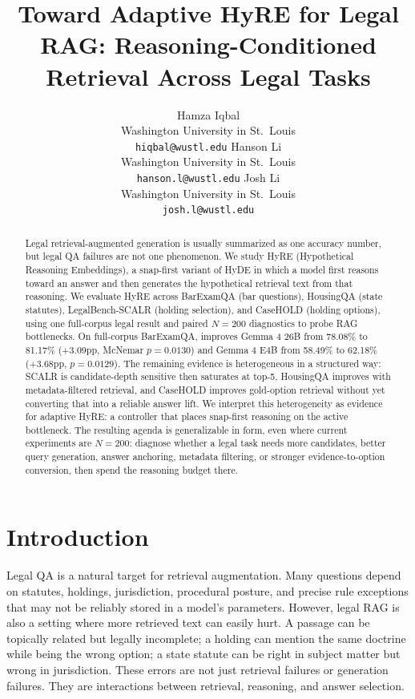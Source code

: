 \documentclass{article}
\title{Toward Adaptive HyRE for Legal RAG: Reasoning-Conditioned Retrieval Across Legal Tasks}
\author{%
  Hamza Iqbal \\
  Washington University in St.\ Louis \\
  \texttt{hiqbal@wustl.edu}
  \And
  Hanson Li \\
  Washington University in St.\ Louis \\
  \texttt{hanson.l@wustl.edu}
  \And
  Josh Li \\
  Washington University in St.\ Louis \\
  \texttt{josh.l@wustl.edu}
}
\newcommand{\method}[1]{\texttt{\detokenize{#1}}}
\newcommand{\hyre}{HyRE}
\begin{document}
\maketitle

\begin{abstract}
Legal retrieval-augmented generation is usually summarized as one accuracy
number, but legal QA failures are not one phenomenon. We study \hyre{}
(Hypothetical Reasoning Embeddings), a snap-first variant of HyDE in which a
model first reasons toward an answer and then generates the hypothetical
retrieval text from that reasoning. We evaluate \hyre{} across BarExamQA
(bar questions), HousingQA (state statutes), LegalBench-SCALR (holding
selection), and CaseHOLD (holding options), using one full-corpus legal result
and paired $N=200$ diagnostics to probe RAG bottlenecks. On full-corpus
BarExamQA, \method{rag_snap_hyde} improves Gemma 4 26B from 78.08\% to
81.17\% (+3.09pp, McNemar $p=0.0130$) and Gemma 4 E4B from 58.49\% to
62.18\% (+3.68pp, $p=0.0129$). The remaining evidence is heterogeneous in a
structured way: SCALR is candidate-depth sensitive then saturates at top-5,
HousingQA improves with metadata-filtered retrieval, and CaseHOLD improves
gold-option retrieval without yet converting that into a reliable answer lift.
We interpret this heterogeneity as evidence for adaptive \hyre{}: a
controller that places snap-first reasoning on the active bottleneck. The
resulting agenda is generalizable in form, even where current experiments are
$N=200$: diagnose whether a legal task needs more candidates, better query
generation, answer anchoring, metadata filtering, or stronger
evidence-to-option conversion, then spend the reasoning budget there.
\end{abstract}

\section{Introduction}

Legal QA is a natural target for retrieval augmentation. Many questions
depend on statutes, holdings, jurisdiction, procedural posture, and precise
rule exceptions that may not be reliably stored in a model's parameters.
However, legal RAG is also a setting where more retrieved text can easily
hurt. A passage can be topically related but legally incomplete; a holding can
mention the same doctrine while being the wrong option; a state statute can be
right in subject matter but wrong in jurisdiction. These errors are not just
retrieval failures or generation failures. They are interactions between
retrieval, reasoning, and answer selection.
\end{document}
